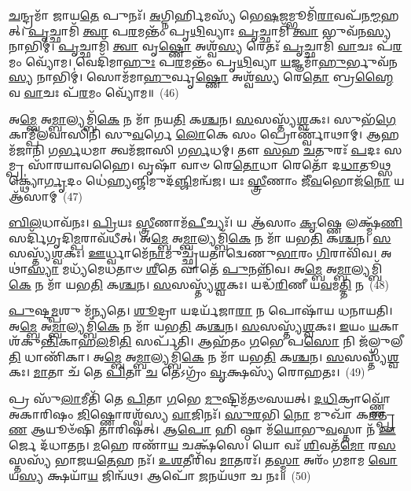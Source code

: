 \-\ul{𑌚}\-𑌨𑍍𑌦𑍍𑌰𑌮𑌾᳴ 𑌜𑌾𑌯\-\ul{𑌤𑍇} 𑌪𑍁𑌨𑌃᳴। \ul{𑌅}\-𑌗𑍍𑌨𑌿𑌰𑍍\mbox{}\-\ul{𑌹𑌿}\-𑌮𑌸𑍍𑌯᳴ 𑌭𑍇\-\ul{𑌷}\-𑌜𑌮𑍍𑌭𑍂𑌮𑌿᳴\-\ul{𑌰𑌾}\-𑌵𑌪᳴𑌨\-\ul{𑌮𑍍𑌮}\-𑌹𑌤𑍍। \ul{𑌪𑍃}\-𑌚𑍍𑌛𑌾𑌮𑌿᳴ \ul{𑌤𑍍𑌵𑌾} 𑌪\-\ul{𑌰}\-𑌮𑌨𑍍𑌤𑌂᳴ 𑌪𑍃\-\ul{𑌥𑌿}\-𑌵𑍍𑌯𑌾𑌃 \ul{𑌪𑍃}\-𑌚𑍍𑌛𑌾𑌮𑌿᳴ \ul{𑌤𑍍𑌵𑌾} 𑌭𑍁𑌵᳴𑌨\-\ul{𑌸𑍍𑌯} 𑌨𑌾𑌭𑌿𑌮𑍍॑। \ul{𑌪𑍃}\-𑌚𑍍𑌛𑌾𑌮𑌿᳴ \ul{𑌤𑍍𑌵𑌾} 𑌵𑍃\-\ul{𑌷𑍍𑌣𑍋} 𑌅𑌶𑍍𑌵᳴\-\ul{𑌸𑍍𑌯} 𑌰𑍇𑌤𑌃᳴ \ul{𑌪𑍃}\-𑌚𑍍𑌛𑌾𑌮𑌿᳴ \ul{𑌵𑌾}\-𑌚𑌃 𑌪᳴\-\ul{𑌰}\-𑌮𑌂 𑌵𑍍𑌯𑍋᳴𑌮। 𑌵𑍇𑌦𑌿᳴𑌮𑌾\-\ul{𑌹𑍁𑌃} 𑌪\-\ul{𑌰}\-𑌮𑌨𑍍𑌤𑌂᳴ 𑌪𑍃\-\ul{𑌥𑌿}\-𑌵𑍍𑌯𑌾 \ul{𑌯}\-𑌜𑍍𑌞𑌮𑌾᳴\-\ul{𑌹𑍁}\-𑌰𑍍𑌭𑍁𑌵᳴𑌨\-\ul{𑌸𑍍𑌯} 𑌨𑌾𑌭𑌿𑌮𑍍॑। 𑌸𑍋𑌮᳴𑌮𑌾\-\ul{𑌹𑍁}\-𑌰𑍍𑌵𑍃\-\ul{𑌷𑍍𑌣𑍋} 𑌅𑌶𑍍𑌵᳴\-\ul{𑌸𑍍𑌯} 𑌰𑍇\-\ul{𑌤𑍋} 𑌬𑍍𑌰\-\ul{𑌹𑍍𑌮𑍈}\-𑌵 \ul{𑌵𑌾}\-𑌚𑌃 𑌪᳴\-\ul{𑌰}\-𑌮𑌂 𑌵𑍍𑌯𑍋᳴𑌮॥~(46)

{\anuvakamend[{𑌸𑍂𑌰𑍍𑌯᳴ 𑌏\-\ul{𑌕𑌾}\-𑌕𑍀 𑌚᳴𑌰\-\ul{𑌤𑌿} 𑌷𑌟𑍍𑌚᳴𑌤𑍍𑌵𑌾𑌰𑌿𑍞𑌶𑌚𑍍𑌚}]}%

𑌅\-\ul{𑌮𑍍𑌬𑍇} 𑌅\-\ul{𑌮𑍍𑌬𑌾}\-𑌲𑍍𑌯𑌮𑍍𑌬𑌿᳴\-\ul{𑌕𑍇} 𑌨 𑌮𑌾᳴ 𑌨𑌯\-\ul{𑌤𑌿} 𑌕\-\ul{𑌶𑍍𑌚}\-𑌨। \ul{𑌸}\-𑌸𑌸𑍍𑌤𑍍𑌯᳴\-\ul{𑌶𑍍𑌵}\-𑌕𑌃। 𑌸𑍁𑌭᳴\-\ul{𑌗𑍇} 𑌕𑌾𑌮𑍍𑌪𑍀᳴𑌲𑌵𑌾𑌸𑌿𑌨𑌿 𑌸𑍁\-\ul{𑌵}\-𑌰𑍍𑌗𑍇 \ul{𑌲𑍋}\-𑌕𑍇 𑌸𑌂 𑌪𑍍𑌰𑍋𑌰𑍍𑌣𑍍𑌵𑌾᳴𑌥𑌾𑌮𑍍। 𑌆𑌹𑌮᳴𑌜𑌾𑌨𑌿 𑌗\-\ul{𑌰𑍍𑌭}\-𑌧𑌮𑌾 𑌤𑍍𑌵𑌮᳴𑌜𑌾𑌸𑌿 𑌗\-\ul{𑌰𑍍𑌭}\-𑌧𑌮𑍍। 𑌤𑍗 \ul{𑌸}\-𑌹 \ul{𑌚}\-𑌤𑍁𑌰𑌃᳴ \ul{𑌪}\-𑌦𑌃 𑌸𑌮𑍍𑌪𑍍𑌰 𑌸𑌾᳴𑌰𑌯𑌾𑌵𑌹𑍈। 𑌵𑍃𑌷𑌾᳴ 𑌵𑌾𑍞 𑌰𑍇\-\ul{𑌤𑍋}\-𑌧𑌾 𑌰𑍇𑌤𑍋᳴ 𑌦\-\ul{𑌧𑌾}\-𑌤𑍂\-\ul{𑌥𑍍𑌸}\-𑌕𑍍𑌥𑍍𑌯𑍋॑\-\ul{𑌰𑍍𑌗𑍃}\-𑌦𑌂 𑌧𑍇॑\-\ul{𑌹𑍍𑌯}\-𑌞𑍍𑌜𑌿𑌮𑍁𑌦᳴\-\ul{𑌞𑍍𑌜𑌿}\-𑌮𑌨𑍍𑌵᳴𑌜। 𑌯𑌃 \ul{𑌸𑍍𑌤𑍍𑌰𑍀}\-𑌣𑌾𑌂 𑌜𑍀᳴\-\ul{𑌵}\-𑌭𑍋𑌜᳴\-\ul{𑌨𑍋} 𑌯 𑌆᳴𑌸𑌾𑌮𑍍~(47)

\-\ul{𑌬𑌿}\-\-\ul{𑌲}\-𑌧𑌾𑌵᳴𑌨𑌃। \ul{𑌪𑍍𑌰𑌿}\-𑌯𑌃 \ul{𑌸𑍍𑌤𑍍𑌰𑍀}\-𑌣𑌾𑌮᳴\-\ul{𑌪𑍀}\-𑌚𑍍𑌯𑌃᳴। 𑌯 𑌆᳴𑌸𑌾𑌂 \ul{𑌕𑍃}\-𑌷𑍍𑌣𑍇 𑌲𑌕𑍍𑌷𑍍𑌮᳴\-\ul{𑌣𑌿} 𑌸𑌰𑍍𑌦𑌿᳴𑌗𑍃𑌦𑌿\-\ul{𑌮𑍍𑌪}\-𑌰𑌾𑌵᳴𑌧𑍀𑌤𑍍। 𑌅\-\ul{𑌮𑍍𑌬𑍇} 𑌅\-\ul{𑌮𑍍𑌬𑌾}\-𑌲𑍍𑌯𑌮𑍍𑌬𑌿᳴\-\ul{𑌕𑍇} 𑌨 𑌮𑌾᳴ 𑌯𑌭\-\ul{𑌤𑌿} 𑌕\-\ul{𑌶𑍍𑌚}\-𑌨। \ul{𑌸}\-𑌸𑌸𑍍𑌤𑍍𑌯᳴\-\ul{𑌶𑍍𑌵}\-𑌕𑌃। \ul{𑌊}\-𑌰𑍍𑌧𑍍𑌵𑌾𑌮𑍇᳴\-\ul{𑌨𑌾}\-𑌮𑍁𑌚𑍍𑌛𑍍𑌰᳴𑌯𑌤𑌾𑌦𑍍𑌵𑍇𑌣𑍁\-\ul{𑌭𑌾}\-𑌰𑌂 \ul{𑌗𑌿}\-𑌰𑌾𑌵𑌿᳴𑌵। 𑌅𑌥𑌾॑\-\ul{𑌸𑍍𑌯𑌾} 𑌮𑌧𑍍𑌯᳴𑌮𑍇𑌧𑌤𑌾𑍞 \ul{𑌶𑍀}\-𑌤𑍇 𑌵𑌾𑌤𑍇᳴ \ul{𑌪𑍁}\-𑌨𑌨𑍍𑌨𑌿᳴𑌵। 𑌅\-\ul{𑌮𑍍𑌬𑍇} 𑌅\-\ul{𑌮𑍍𑌬𑌾}\-𑌲𑍍𑌯𑌮𑍍𑌬𑌿᳴\-\ul{𑌕𑍇} 𑌨 𑌮𑌾᳴ 𑌯𑌭\-\ul{𑌤𑌿} 𑌕\-\ul{𑌶𑍍𑌚}\-𑌨। \ul{𑌸}\-𑌸𑌸𑍍𑌤𑍍𑌯᳴\-\ul{𑌶𑍍𑌵}\-𑌕𑌃। 𑌯𑌦𑍍𑌧᳴\-\ul{𑌰𑌿}\-𑌣𑍀 𑌯\-\ul{𑌵}\-𑌮\-\ul{𑌤𑍍𑌤𑌿} 𑌨~(48)

\-\ul{𑌪𑍁}\-𑌷𑍍𑌟\-\ul{𑌮𑍍𑌪}\-𑌶𑍁 𑌮᳴𑌨𑍍𑌯𑌤𑍇। \ul{𑌶𑍂}\-𑌦𑍍𑌰𑌾 𑌯𑌦𑌰𑍍𑌯᳴𑌜𑌾\-\ul{𑌰𑌾} 𑌨 𑌪𑍋𑌷𑌾᳴𑌯 𑌧𑌨𑌾𑌯𑌤𑌿। 𑌅\-\ul{𑌮𑍍𑌬𑍇} 𑌅\-\ul{𑌮𑍍𑌬𑌾}\-𑌲𑍍𑌯𑌮𑍍𑌬𑌿᳴\-\ul{𑌕𑍇} 𑌨 𑌮𑌾᳴ 𑌯𑌭\-\ul{𑌤𑌿} 𑌕\-\ul{𑌶𑍍𑌚}\-𑌨। \ul{𑌸}\-𑌸𑌸𑍍𑌤𑍍𑌯᳴\-\ul{𑌶𑍍𑌵}\-𑌕𑌃। \ul{𑌇}\-𑌯𑌂 \ul{𑌯}\-𑌕𑌾 𑌶᳴𑌕𑍁\-\ul{𑌨𑍍𑌤𑌿}\-𑌕𑌾𑌹\-\ul{𑌲}\-𑌮𑌿\-\ul{𑌤𑌿} 𑌸𑌰𑍍𑌪᳴𑌤𑌿। 𑌆𑌹᳴𑌤𑌂 \ul{𑌗}\-𑌭𑍇 𑌪\-\ul{𑌸𑍋} 𑌨𑌿 𑌜᳴𑌲𑍍𑌗𑍁𑌲𑍀\-\ul{𑌤𑌿} 𑌧𑌾𑌣𑌿᳴𑌕𑌾। 𑌅\-\ul{𑌮𑍍𑌬𑍇} 𑌅\-\ul{𑌮𑍍𑌬𑌾}\-𑌲𑍍𑌯𑌮𑍍𑌬𑌿᳴\-\ul{𑌕𑍇} 𑌨 𑌮𑌾᳴ 𑌯𑌭\-\ul{𑌤𑌿} 𑌕\-\ul{𑌶𑍍𑌚}\-𑌨। \ul{𑌸}\-𑌸𑌸𑍍𑌤𑍍𑌯᳴\-\ul{𑌶𑍍𑌵}\-𑌕𑌃। \ul{𑌮𑌾}\-𑌤𑌾 𑌚᳴ 𑌤𑍇 \ul{𑌪𑌿}\-𑌤𑌾 \ul{𑌚} 𑌤𑍇\-𑌽𑌗𑍍𑌰𑌂᳴ \ul{𑌵𑍃}\-𑌕𑍍𑌷𑌸𑍍𑌯᳴ 𑌰𑍋𑌹𑌤𑌃।~(49)

𑌪𑍍𑌰 𑌸𑍁᳴\-\ul{𑌲𑌾}\-𑌮𑍀𑌤𑌿᳴ 𑌤𑍇 \ul{𑌪𑌿}\-𑌤𑌾 \ul{𑌗}\-𑌭𑍇 \ul{𑌮𑍁}\-𑌷𑍍𑌟𑌿𑌮᳴𑌤𑍞𑌸𑌯𑌤𑍍। \ul{𑌦}\-\-\ul{𑌧𑌿}\-𑌕𑍍𑌰𑌾𑌵𑍍𑌣𑍍𑌣𑍋᳴ 𑌅𑌕𑌾𑌰𑌿𑌷𑌂 \ul{𑌜𑌿}\-𑌷𑍍𑌣𑍋𑌰𑌶𑍍𑌵᳴𑌸𑍍𑌯 \ul{𑌵𑌾}\-𑌜𑌿𑌨𑌃᳴। \ul{𑌸𑍁}\-\-\ul{𑌰}\-𑌭𑌿 \ul{𑌨𑍋} 𑌮𑍁𑌖𑌾᳴ 𑌕\-\ul{𑌰}\-𑌤𑍍𑌪𑍍𑌰 \ul{𑌣} 𑌆𑌯𑍂𑍞᳴𑌷𑌿 𑌤𑌾𑌰𑌿𑌷𑌤𑍍। 𑌆\-\ul{𑌪𑍋} 𑌹𑌿 𑌷𑍍𑌠𑌾 𑌮᳴\-\ul{𑌯𑍋}\-𑌭𑍁\-\ul{𑌵}\-𑌸𑍍𑌤𑌾 𑌨᳴ \ul{𑌊}\-𑌰𑍍𑌜𑍇 𑌦᳴𑌧𑌾𑌤𑌨। \ul{𑌮}\-𑌹𑍇 𑌰𑌣𑌾᳴\-\ul{𑌯} 𑌚𑌕𑍍𑌷᳴𑌸𑍇। 𑌯𑍋 𑌵𑌃᳴ \ul{𑌶𑌿}\-𑌵𑌤᳴\-\ul{𑌮𑍋} 𑌰\-\ul{𑌸}\-𑌸𑍍𑌤𑌸𑍍𑌯᳴ 𑌭𑌾𑌜𑌯\-\ul{𑌤𑍇}\-𑌹 𑌨𑌃᳴। \ul{𑌉}\-\-\ul{𑌶}\-𑌤𑍀𑌰𑌿᳴𑌵 \ul{𑌮𑌾}\-𑌤𑌰𑌃᳴। 𑌤\-\ul{𑌸𑍍𑌮𑌾} 𑌅𑌰𑌂᳴ 𑌗𑌮𑌾𑌮 \ul{𑌵𑍋} 𑌯\-\ul{𑌸𑍍𑌯} 𑌕𑍍𑌷𑌯𑌾᳴\-\ul{𑌯} 𑌜𑌿𑌨𑍍𑌵᳴𑌥। 𑌆𑌪𑍋᳴ \ul{𑌜}\-𑌨𑌯᳴𑌥𑌾 𑌚 𑌨𑌃॥~(50)

